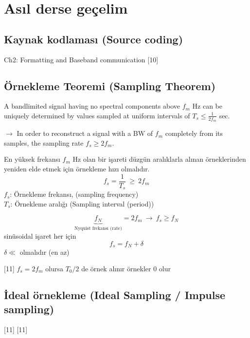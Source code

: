 \documentclass[11pt,a4paper]{article}
\begin{document}
\section{Asıl derse geçelim}
\subsection{Kaynak kodlaması (Source coding)}
Ch2: Formatting and Baseband communication
[10]

\subsection{Örnekleme Teoremi (Sampling Theorem)}
A bandlimited signal having no spectral components above $f_m$ Hz can be uniquely determined by values sampled at uniform intervals of $T_s\le\frac{1}{2f_m}$ sec.

$\longrightarrow$ In order to reconstruct a signal with a BW of $f_m$ completely from its samples, the sampling rate $f_s\ge 2f_m$.

En yüksek frekansı $f_m$ Hz olan bir işareti düzgün aralıklarla alınan örneklerinden yeniden elde etmek için örnekleme hızı  olmalıdır.
\[ f_s=\frac{1}{T_s}\ \ge\ 2f_m \]
$f_s$: Örnekleme frekansı, (sampling frequency)\\
$T_s$: Örnekleme aralığı (Sampling interval (period))

\[ \underbrace{f_N}_{\text{Nyquist frekansı (rate)}}=2f_m\ \longrightarrow\ f_s\ge f_N \]
 sinüsoidal işaret her için
\[ f_s=f_N+\delta \]
$\delta\ll$ olmalıdır (en az)

[11]
$f_s=2f_m$ olursa $T_0/2$ de örnek alınır örnekler 0 olur

\subsection{İdeal örnekleme (Ideal Sampling / Impulse sampling)}
[11]
[11]
\end{document}
